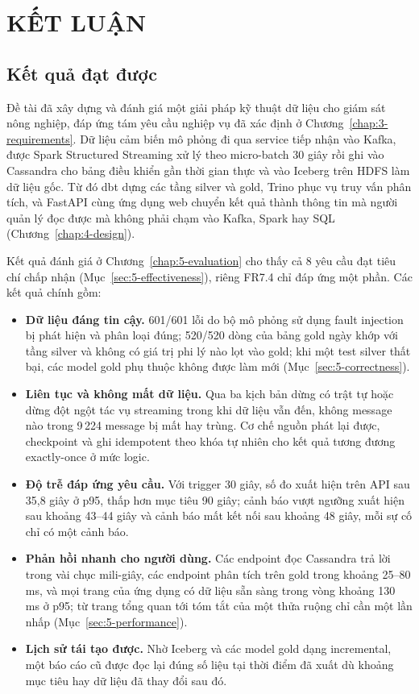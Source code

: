 \chapter{KẾT LUẬN}
\label{chap:6-conclusion}

\section{Kết quả đạt được}
\label{sec:6-results}

Đề tài đã xây dựng và đánh giá một giải pháp kỹ thuật dữ liệu cho giám sát nông nghiệp, đáp ứng tám yêu cầu nghiệp vụ đã xác định ở Chương~\ref{chap:3-requirements}. Dữ liệu cảm biến mô phỏng đi qua service tiếp nhận vào Kafka, được Spark Structured Streaming xử lý theo micro-batch 30 giây rồi ghi vào Cassandra cho bảng điều khiển gần thời gian thực và vào Iceberg trên HDFS làm dữ liệu gốc. Từ đó dbt dựng các tầng silver và gold, Trino phục vụ truy vấn phân tích, và FastAPI cùng ứng dụng web chuyển kết quả thành thông tin mà người quản lý đọc được mà không phải chạm vào Kafka, Spark hay SQL (Chương~\ref{chap:4-design}).

Kết quả đánh giá ở Chương~\ref{chap:5-evaluation} cho thấy cả 8 yêu cầu đạt tiêu chí chấp nhận (Mục~\ref{sec:5-effectiveness}), riêng FR7.4 chỉ đáp ứng một phần. Các kết quả chính gồm:

\begin{itemize}
  \item \textbf{Dữ liệu đáng tin cậy.} 601/601 lỗi do bộ mô phỏng sử dụng fault injection bị phát hiện và phân loại đúng; 520/520 dòng của bảng gold ngày khớp với tầng silver và không có giá trị phi lý nào lọt vào gold; khi một test silver thất bại, các model gold phụ thuộc không được làm mới (Mục~\ref{sec:5-correctness}).
  \item \textbf{Liên tục và không mất dữ liệu.} Qua ba kịch bản dừng có trật tự hoặc dừng đột ngột tác vụ streaming trong khi dữ liệu vẫn đến, không message nào trong 9\,224 message bị mất hay trùng. Cơ chế nguồn phát lại được, checkpoint và ghi idempotent theo khóa tự nhiên cho kết quả tương đương exactly-once ở mức logic.
  \item \textbf{Độ trễ đáp ứng yêu cầu.} Với trigger 30 giây, số đo xuất hiện trên API sau 35,8 giây ở p95, thấp hơn mục tiêu 90 giây; cảnh báo vượt ngưỡng xuất hiện sau khoảng 43--44 giây và cảnh báo mất kết nối sau khoảng 48 giây, mỗi sự cố chỉ có một cảnh báo.
  \item \textbf{Phản hồi nhanh cho người dùng.} Các endpoint đọc Cassandra trả lời trong vài chục mili-giây, các endpoint phân tích trên gold trong khoảng 25--80 ms, và mọi trang của ứng dụng có dữ liệu sẵn sàng trong vòng khoảng 130 ms ở p95; từ trang tổng quan tới tóm tắt của một thửa ruộng chỉ cần một lần nhấp (Mục~\ref{sec:5-performance}).
  \item \textbf{Lịch sử tái tạo được.} Nhờ Iceberg và các model gold dạng incremental, một báo cáo cũ được đọc lại đúng số liệu tại thời điểm đã xuất dù khoảng mục tiêu hay dữ liệu đã thay đổi sau đó.
\end{itemize}

